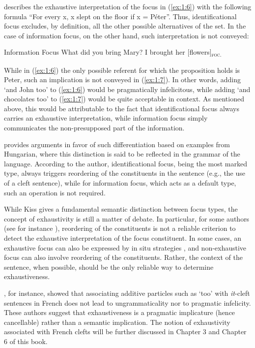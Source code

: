  \textcite{szabolcsi1981semantics} describes the exhaustive interpretation of the focus in (\ref{ex:1:6}) with the following formula ``For every x, x slept on the floor if x = Péter”. Thus, identificational focus excludes, by definition, all the other possible alternatives of the set. In the case of information focus, on the other hand, such interpretation is not conveyed:

\ea \label{ex:1:7}  {Information Focus}
\ea What did you bring Mary?
\ex I brought her [flowers]\textsubscript{\textsc{foc.}}\normalsize
\z \z

While in (\ref{ex:1:6}) the only possible referent for which the proposition holds is Peter, such an implication is not conveyed in (\ref{ex:1:7}). In other words, adding ‘and John too' to (\ref{ex:1:6}) would be pragmatically infelicitous, while adding ‘and chocolates too' to (\ref{ex:1:7}) would be quite acceptable in context. As mentioned above, this would be attributable to the fact that identificational focus always carries an exhaustive interpretation, while information focus simply communicates the non-presupposed part of the information.

\textcite{kiss1998identificational} provides arguments in favor of such differentiation based on examples from Hungarian, where this distinction is said to be reflected in the grammar of the language. According to the author, identificational focus, being the most marked type, always triggers reordering of the constituents in the sentence (e.g., the use of a cleft sentence), while for information focus, which acts as a default type, such an operation is not required.

While Kiss gives a fundamental semantic distinction between focus types, the concept of exhaustivity is still a matter of debate. In particular, for some authors (see for instance \cite{horn1981exhaustiveness, destruel2018interpretation}), reordering of the constituents is not a reliable criterion to detect the exhaustive interpretation of the focus constituent. In some cases, an exhaustive focus can also be expressed by in situ strategies \parencite{gabriel2010focus, fery2001focus, uth2014spanish}, and non-exhaustive focus can also involve reordering of the constituents. Rather, the context of the sentence, when possible, should be the only reliable way to determine exhaustiveness. 

\textcite{destruel2012french}, for instance, showed that associating additive particles such as `too' with \textit{it}-cleft sentences in French does not lead to ungrammaticality nor to pragmatic infelicity. These authors suggest that exhaustiveness is a pragmatic implicature (hence cancellable) rather than a semantic implication. The notion of exhaustivity associated with French clefts will be further discussed in Chapter 3 and Chapter 6 of this book.

